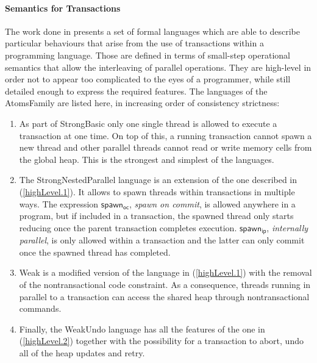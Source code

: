 \paragraph{Semantics for Transactions} The work done in \cite{semanticsTransactions} presents a set of formal languages which are able to describe particular behaviours that arise from the use of transactions within a programming language. Those are defined in terms of small-step operational semantics that allow the interleaving of parallel operations. They are high-level in order not to appear too complicated to the eyes of a programmer, while still detailed enough to express the required features. The languages of the \textsf{AtomsFamily} are listed here, in increasing order of consistency strictness:
\begin{enumerate}
	\item \label{highLevel.1} As part of \textsf{StrongBasic} only one single thread is allowed to execute a transaction at one time. On top of this, a running transaction cannot spawn a new thread and other parallel threads cannot read or write memory cells from the global heap. This is the strongest and simplest of the languages.
	
	\item The \textsf{StrongNestedParallel} language is an extension of the one described in (\ref{highLevel.1}). It allows to spawn threads within transactions in multiple ways. The expression $\mathsf{spawn_{oc}}$, \textit{spawn on commit}, is allowed anywhere in a program, but if included in a transaction, the spawned thread only starts reducing once the parent transaction completes execution. $\mathsf{spawn_{ip}}$, \textit{internally parallel}, is only allowed within a transaction and the latter can only commit once the spawned thread has completed.
	
	\item \label{highLevel.2} \textsf{Weak} is a modified version of the language in (\ref{highLevel.1}) with the removal of the nontransactional code constraint. As a consequence, threads running in parallel to a transaction can access the shared heap through nontransactional commands.
	
	\item Finally, the \textsf{WeakUndo} language has all the features of the one in (\ref{highLevel.2}) together with the possibility for a transaction to abort, undo all of the heap updates and retry.
\end{enumerate}

